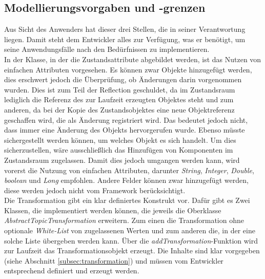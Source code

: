     \subsection{Modellierungsvorgaben und -grenzen}
    \label{subsec:modellierungsgrenzen}
        Aus Sicht des Anwenders hat dieser drei Stellen, die in seiner Verantwortung liegen. Damit steht  
        dem Entwickler alles zur Verfügung, was er benötigt, um seine Anwendungsfälle nach den Bedürfnissen zu implementieren. 
        \\
        \linebreak
        In der Klasse, in der die Zustandsattribute abgebildet werden, ist das Nutzen von einfachen Attributen vorgesehen. Es können 
        zwar Objekte hinzugefügt werden, dies erschwert jedoch die Überprüfung, ob Änderungen darin vorgenommen wurden. 
        Dies ist zum Teil der Reflection geschuldet, da im Zustandsraum lediglich die Referenz des zur Laufzeit erzeugten Objektes 
        steht und zum anderen, da bei der Kopie des Zustandsobjektes eine neue Objektreferenz geschaffen wird, die als Änderung 
        registriert wird. Das bedeutet jedoch nicht, dass immer eine Änderung des Objekts hervorgerufen wurde. Ebenso müsste sichergestellt 
        werden können, um welches Objekt es sich handelt. Um dies sicherzustellen, wäre ausschließlich das Hinzufügen von Komponenten im 
        Zustandsraum zugelassen. Damit dies jedoch umgangen werden kann, wird vorerst die Nutzung von einfachen Attributen, darunter 
        \textit{String}, \textit{Integer}, \textit{Double}, \textit{boolean} und \textit{Long} empfohlen. Andere Felder können zwar hinzugefügt werden, 
        diese werden jedoch nicht vom Framework berücksichtigt.
        \\
        \linebreak
        Die Transformation gibt ein klar definiertes Konstrukt vor. Dafür gibt es Zwei Klassen, die implementiert werden können, die 
        jeweils die Oberklasse \textit{AbstractTopicTransformation} erweitern. Zum einen die Transformation ohne 
        optionale \textit{White-List} von zugelassenen Werten und zum anderen die, in der eine solche Liste übergeben werden kann. Über die 
        \textit{addTransformation}-Funktion wird zur Laufzeit das Transformationsobjekt erzeugt. Die Inhalte sind klar vorgegeben (siehe Abschnitt \ref{subsec:transformation}) 
        und müssen vom Entwickler entsprechend definiert und erzeugt werden.
        \\
